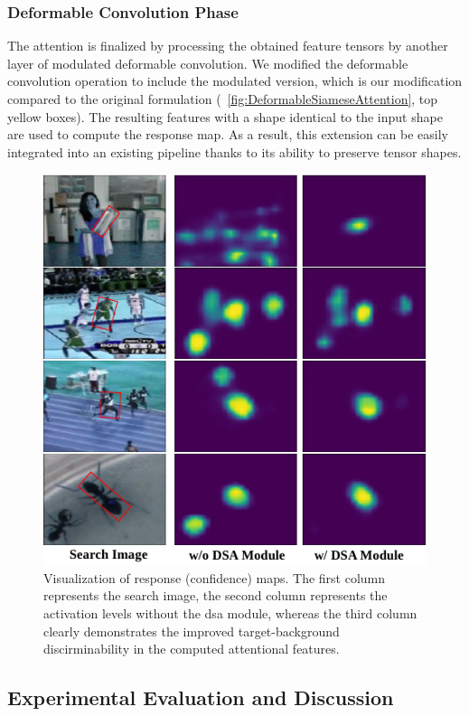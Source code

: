 \subsubsection{Deformable Convolution Phase}

The attention is finalized by processing the obtained feature tensors by another layer of modulated deformable convolution. We modified the deformable convolution operation to include the modulated version, which is our modification compared to the original formulation (\figtext{}~\ref{fig:DeformableSiameseAttention}, top yellow boxes). The resulting features with a shape identical to the input shape are used to compute the response map. As a result, this extension can be easily integrated into an existing pipeline thanks to its ability to preserve tensor shapes.

\begin{figure}[t]
    \centerline{\includegraphics[width=0.5\linewidth]{figures/siamese_tracking/dsa_attention_visualization.pdf}}
    \caption[\gls{dsa} attention visualization]{Visualization of response (confidence) maps. The first column represents the search image, the second column represents the activation levels without the \gls{dsa} module, whereas the third column clearly demonstrates the improved target-background discirminability in the computed attentional features. }
    \label{fig:DSAAttentionVisualization}
\end{figure}

\subsection{Experimental Evaluation and Discussion}
\label{ssec:DSAExperimentalEvaluation}

